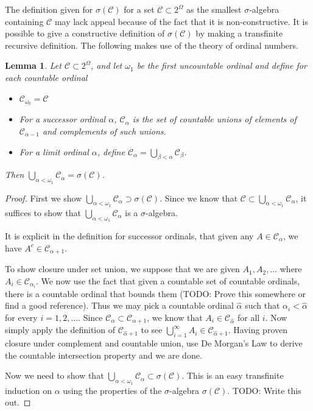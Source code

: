 \documentclass{amsart}
\newtheorem{lem}[thm]{Lemma}
\theoremstyle{remark}
\theoremstyle{definition}
\begin{document}
The definition given for $\sigma(\mathcal{C})$ for a set $\mathcal{C}
\subset 2^\Omega$ as the smallest $\sigma$-algebra containing
$\mathcal{C}$ may lack appeal because of the fact that it is
non-constructive.  It is possible to give a constructive definition of
$\sigma(\mathcal{C})$ by making a transfinite recursive definition.
The following makes use of the theory of ordinal numbers.
\begin{lem}Let $\mathcal{C} \subset 2^\Omega$, and let $\omega_1$ be
  the first uncountable ordinal and define for each countable ordinal
\begin{itemize}
\item[(i)]$\mathcal{C}_{\omega_0} = \mathcal{C}$
\item[(ii)]For a successor ordinal $\alpha$, $\mathcal{C}_\alpha$ is
  the set of countable unions of elements of $\mathcal{C}_{\alpha -
    1}$ and complements of such unions.
\item[(iii)]For a limit ordinal $\alpha$, define $\mathcal{C}_\alpha =
  \bigcup_{\beta < \alpha} \mathcal{C}_\beta$.
\end{itemize}
Then $\bigcup_{\alpha < \omega_1} \mathcal{C}_\alpha = \sigma(\mathcal{C})$.
\end{lem}
\begin{proof}
First we show $\bigcup_{\alpha < \omega_1} \mathcal{C}_\alpha \supset
\sigma(\mathcal{C})$.  Since we know that $\mathcal{C} \subset
\bigcup_{\alpha < \omega_1} \mathcal{C}_\alpha$, it suffices to show
that $\bigcup_{\alpha < \omega_1} \mathcal{C}_\alpha$ is a
$\sigma$-algebra.

It is explicit in the definition for successor
ordinals, that given any $A \in \mathcal{C}_\alpha$, we have $A^c \in  \mathcal{C}_{\alpha+1}$.

To show closure under set union, we suppose that we are
given $A_1, A_2, \dots$ where $A_i \in \mathcal{C}_{\alpha_i}$.  We now
use the fact that given a countable set of countable ordinals, there
is a countable ordinal that bounds them (TODO: Prove this somewhere or
find a good reference).  Thus we may pick a countable ordinal $\hat
\alpha$ such that $\alpha_i < \hat {\alpha}$ for every $i=1,2,\dots$.  Since
$\mathcal{C}_\alpha \subset \mathcal{C}_{\alpha+1}$, we know that $A_i
\in \mathcal{C}_{\hat \alpha}$ for all $i$.  Now simply apply the definition
of $\mathcal{C}_{\hat \alpha + 1}$ to see
$\bigcup_{i=1}^\infty A_i \in \mathcal{C}_{\hat \alpha + 1}$.  Having
proven closure under complement and countable union, use De
Morgan's Law to derive the countable intersection property and we are done.

Now we need to show that $\bigcup_{\alpha < \omega_1} \mathcal{C}_\alpha \subset
\sigma(\mathcal{C})$.  This is an easy transfinite induction on
$\alpha$ using the properties of the $\sigma$-algebra
$\sigma(\mathcal{C})$.
TODO: Write this out.
\end{proof}
\end{document}
